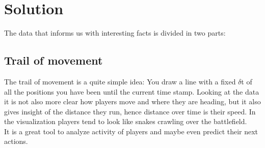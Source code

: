 \documentclass[a4paper]{article}
\theoremstyle{plain} %
\theoremstyle{definition} %
\begin{document}
\section*{Solution}
The data that informs us with interesting facts is divided in two parts:
\subsection*{Trail of movement}
The trail of movement is a quite simple idea: You draw a line with a fixed $\delta$t of all the positions you have been until the current time stamp. Looking at the data it is not also more clear how players move and where they are heading, but it also gives insight of the distance they run, hence distance over time is their speed. In the visualization players tend to look like snakes crawling over the battlefield.\\
It is a great tool to analyze activity of players and maybe even predict their next actions.
\end{document}
